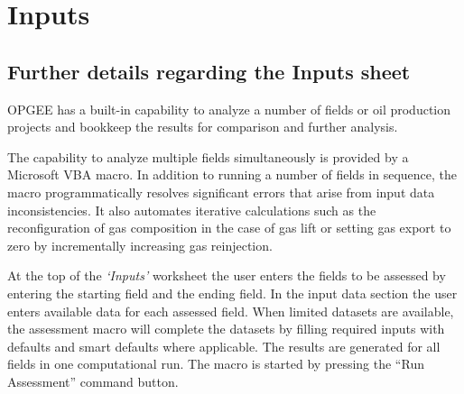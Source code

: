 \documentclass[11pt]{report}
\newcommand{\marg}[1]{{\footnotesize\textit{\textcolor{stanford}{'#1'}}}}
\newcommand{\marginnote}[1]{\marginpar{\marg{#1}}}
\newcommand{\sheet}[1]{\textit{`{#1}'}}
\begin{document}
\clearpage




\section{Inputs} \label{sec:inputs}

\subsection{Further details regarding the Inputs sheet}
OPGEE has a built-in capability to analyze a number of fields or oil production projects and bookkeep the results for comparison and further analysis.

The capability to analyze multiple fields simultaneously is provided by a Microsoft VBA macro. In addition to running a number of fields in sequence, the macro programmatically resolves significant errors that arise from input data inconsistencies. It also automates iterative calculations such as the reconfiguration of gas composition in the case of gas lift or setting gas export to zero by incrementally increasing gas reinjection.

At the top of the \sheet{Inputs} worksheet the user enters the fields to be assessed by entering the starting field and the ending field. In the input data section\marginnote{Inputs 1.1-1.8} the user enters available data for each assessed field. When limited datasets are available, the assessment macro will complete the datasets by filling required inputs with defaults and smart defaults where applicable. The results are generated for all fields in one computational run. The macro is started by pressing the ``Run Assessment'' command button.
\end{document}
